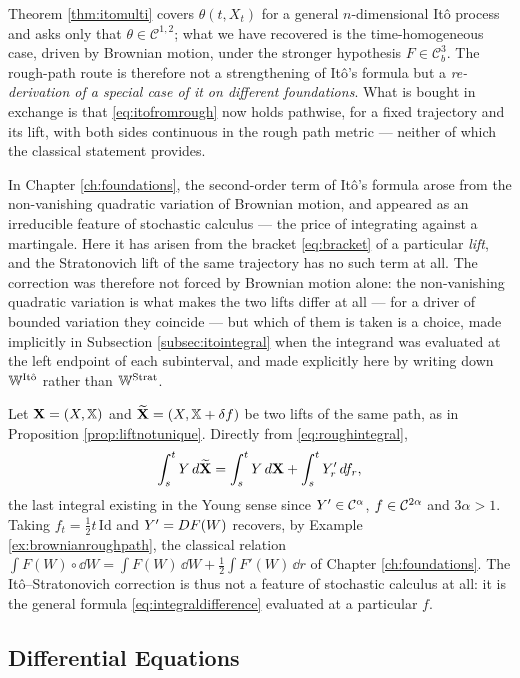 Theorem
\ref{thm:itomulti} covers $\theta(t,X_t)$ for a general $n$-dimensional Itô process and asks only
that $\theta \in \mathcal{C}^{1,2}$; what we have recovered is the time-homogeneous case, driven by
Brownian motion, under the stronger hypothesis $F \in \mathcal{C}^3_b$. The rough-path route is
therefore not a strengthening of Itô's formula but a \emph{re-derivation of a special case of it on
different foundations}. What is bought in exchange is that \eqref{eq:itofromrough} now holds pathwise,
for a fixed trajectory and its lift, with both sides continuous in the rough path metric --- neither
of which the classical statement provides.


In Chapter \ref{ch:foundations}, the second-order term of Itô's formula arose from
the non-vanishing quadratic variation of Brownian motion, and appeared as an irreducible feature of
stochastic calculus --- the price of integrating against a martingale. Here it has arisen from the
bracket \eqref{eq:bracket} of a particular \emph{lift}, and the Stratonovich lift of the same
trajectory has no such term at all. The correction was therefore not forced by Brownian motion
alone: the non-vanishing quadratic variation is what makes the two lifts differ at all --- for a
driver of bounded variation they coincide --- but which of them is taken is
a choice, made implicitly in Subsection \ref{subsec:itointegral} when the integrand
was evaluated at the left endpoint of each subinterval, and made explicitly here by writing down
$\mathbb{W}^{\mathrm{It\hat o}}$ rather than $\mathbb{W}^{\mathrm{Strat}}$.

Let $\mathbf{X} = (X,\mathbb{X})$ and $\widetilde{\mathbf{X}} = (X, \mathbb{X} + \delta f)$ be two lifts of the same
path, as in Proposition \ref{prop:liftnotunique}. Directly from \eqref{eq:roughintegral},
\begin{equation}\label{eq:integraldifference}
\int_s^t Y\,d\widetilde{\mathbf{X}} = \int_s^t Y\,d\mathbf{X} + \int_s^t Y'_r\,d f_r ,
\end{equation}
the last integral existing in the Young sense since $Y' \in \mathcal{C}^{\alpha}$,
$f\in\mathcal{C}^{2\alpha}$ and $3\alpha>1$. Taking $f_t = \tfrac12 t\,\mathrm{Id}$ and $Y' = DF(W)$
recovers, by Example \ref{ex:brownianroughpath}, the classical relation
$\int F(W)\circ\dd W = \int F(W)\,\dd W + \tfrac12\int F'(W)\,\dd r$ of Chapter \ref{ch:foundations}. The
Itô--Stratonovich correction is thus not a feature of stochastic calculus at all: it is the general
formula \eqref{eq:integraldifference} evaluated at a particular $f$.


\subsection{Differential Equations}\label{subsec:rdes}

